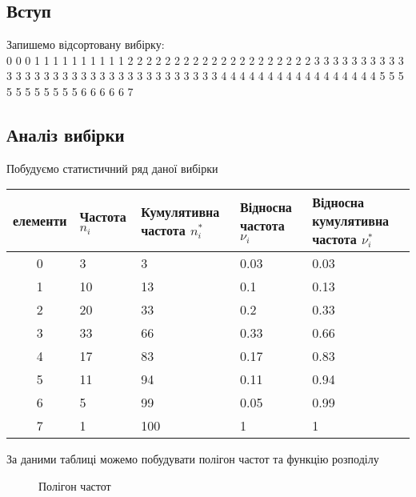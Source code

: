 \documentclass{article}
\begin{document}
\subsection{Вступ}
Запишемо відсортовану вибірку: \\
0 0 0 1 1 1 1 1 1 1 1 1 1 2 2 2 2 2 2 2 2 2 2 2 2 2 2 2 2 2 2 2 2 3 3 3 3 3 3 3 3 3 3 3 3 3 3 3 3 3
3 3 3 3 3 3 3 3 3 3 3 3 3 3 3 3 4 4 4 4 4 4 4 4 4 4 4 4 4 4 4 4 4 5 5 5 5 5 5 5 5 5 5 5 6 6 6 6 6 7
\subsection{Аналіз вибірки}
Побудуємо статистичний ряд даної вибірки
\begin{center}
    \begin{tabular}{|c||m{2cm}|m{2cm}|m{2cm}|m{2cm}|}
        \hline
        елементи & Частота $n_i$ & Кумулятивна частота $n^*_i$ & Відносна частота $\nu_i$ & Відносна
        кумулятивна частота $\nu^*_i$ \\
        \hline \hline
        0 & 3  & 3   & 0.03 & 0.03 \\
        \hline
        1 & 10 & 13  & 0.1  & 0.13 \\
        \hline
        2 & 20 & 33  & 0.2  & 0.33 \\
        \hline
        3 & 33 & 66  & 0.33 & 0.66 \\
        \hline
        4 & 17 & 83  & 0.17 & 0.83 \\
        \hline
        5 & 11 & 94  & 0.11 & 0.94 \\
        \hline
        6 & 5  & 99  & 0.05 & 0.99 \\
        \hline
        7 & 1  & 100 & 1   & 1 \\
        \hline
    \end{tabular}
    
\end{center}
\newpage
За даними таблиці можемо побудувати полігон частот та функцію розподілу 
\begin{figure}[H]
    \centering
    \caption{Полігон частот}
\end{figure}
\end{document}
